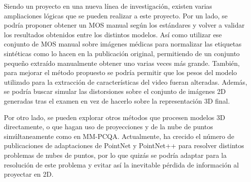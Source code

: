 Siendo un proyecto en una nueva línea de investigación, existen varias ampliaciones 
lógicas que se pueden realizar a este proyecto. Por un lado, se podría proponer 
obtener un MOS manual según los estándares y volver a validar los resultados obtenidos
entre los distintos modelos. Así como utilizar ese conjunto de MOS manual sobre imágenes médicas 
para normalizar las etiquetas sintéticas como lo hacen en la publicación original, 
permitiendo de un conjunto pequeño extraído manualmente obtener uno varias 
veces más grande. También, para mejorar el método propuesto se podría permitir 
que los pesos del modelo utilizado para la extracción de características 
del video fueran alteradas. Además, se podría buscar simular las distorsiones 
sobre el conjunto de imágenes 2D generadas tras el examen en vez de hacerlo 
sobre la representación 3D final. 

Por otro lado, se pueden explorar otros métodos que procesen modelos 3D directamente, 
o que hagan uso de proyecciones y de la nube de puntos simúltaneamente como en MM-PCQA\cite{MM-PCQA}.
Actualmente, ha crecido el número de publicaciones de adaptaciones de PointNet\cite{PointNet} y 
PointNet++\cite{PointNet++} para resolver distintos problemas de nubes de puntos, 
por lo que quizás se podría adaptar para la resolución de este problema y evitar así 
la inevitable pérdida de información al proyectar en 2D.


